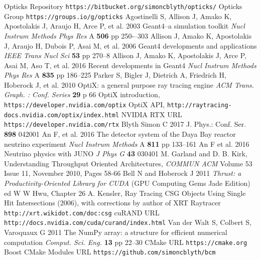 \documentclass{webofc}
\begin{document}
\begin{thebibliography}{}
%
Opticks Repository {\tt https://bitbucket.org/simoncblyth/opticks/}
Opticks Group {\tt https://groups.io/g/opticks}
Agostinelli S, Allison J, Amako K, Apostolakis J, Araujo H, Arce P, et al.
2003
Geant4--a simulation toolkit
{\it Nucl Instrum Methods Phys Res} A {\bf 506} pp 250-–303
Allison J, Amako K, Apostolakis J, Araujo H, Dubois P, Asai M, et al.
2006
Geant4 developments and applications
{\it IEEE Trans Nucl Sci} {\bf 53} pp 270--8
Allison J, Amako K, Apostolakis J, Arce P, Asai M, Aso T, et al.
2016
Recent developments in Geant4
{\it Nucl Instrum Methods Phys Res} A {\bf 835} pp 186--225
Parker S, Bigler J, Dietrich A, Friedrich H, Hoberock J, et al.
2010
OptiX: a general purpose ray tracing engine
{\it ACM Trans. Graph. : Conf. Series} {\bf 29} p 66
OptiX introduction, {\tt https://developer.nvidia.com/optix}
OptiX API, {\tt http://raytracing-docs.nvidia.com/optix/index.html}
NVIDIA RTX URL {\tt https://developer.nvidia.com/rtx}
Blyth Simon C 2017 J. Phys.: Conf. Ser. {\bf 898} 042001
An F, et al.
2016
The detector system of the Daya Bay reactor neutrino experiment
{\it Nucl Instrum Methods} A {\bf 811} pp 133--161
An F et al.
2016
Neutrino physics with JUNO
{\it J Phys G} {\bf 43} 030401
M. Garland and D. B. Kirk, Understanding Throughput Oriented Architectures, 
{\it COMMUN ACM} Volume 53 Issue 11, November 2010, Pages 58-66  	
Bell N and Hoberock J 
2011
{\it Thrust: a Productivity-Oriented Library for CUDA}
(GPU Computing Gems Jade Edition) ed W W Hwu, Chapter 26
A. Kensler, Ray Tracing CSG Objects Using Single Hit Intersections (2006), 
with corrections by author of XRT Raytracer {\tt http://xrt.wikidot.com/doc:csg}
cuRAND URL {\tt http://docs.nvidia.com/cuda/curand/index.html}
Van der Walt S, Colbert S, Varoquaux G 
2011 
The NumPy array: a structure for efficient numerical computation
{\it Comput. Sci. Eng.} {\bf 13} pp 22--30
CMake URL {\tt https://cmake.org}
Boost CMake Modules URL {\tt https://github.com/simoncblyth/bcm}
%
\end{thebibliography}
\end{document}

